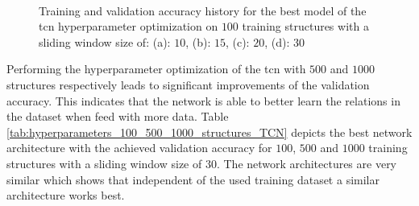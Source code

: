 \documentclass[conference]{IEEEtran}
\begin{document}
\begin{figure}[htp]
	\centering
	\quad
	\\
	\quad
	\caption{Training and validation accuracy history for the best model of the \gls{tcn} hyperparameter optimization on $ 100 $ training structures with a sliding window size of: (a): $ 10 $, (b): $ 15 $, (c): $ 20 $, (d): $ 30 $}
	\label{fig:accuracy_100_structures_random_search_tcn}
\end{figure}

Performing the hyperparameter optimization of the \gls{tcn} with $ 500 $ and $ 1000 $ structures respectively leads to significant improvements of the validation accuracy. This indicates that the network is able to better learn the relations in the dataset when feed with more data. Table \ref{tab:hyperparameters_100_500_1000_structures_TCN} depicts the best network architecture with the achieved validation accuracy for $ 100 $, $ 500 $ and $ 1000 $ training structures with a sliding window size of $ 30 $. The network architectures are very similar which shows that independent of the used training dataset a similar architecture works best.
\end{document}
